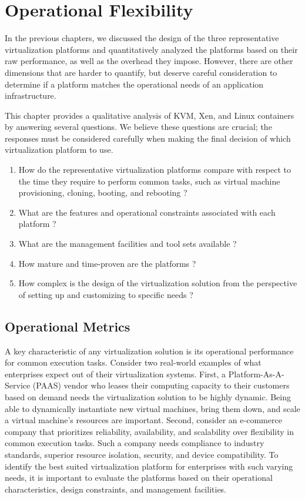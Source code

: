 \chapter{Operational Flexibility}

In the previous chapters, we discussed the design of the three representative virtualization platforms and quantitatively analyzed the platforms based on their raw performance, as well as the overhead they impose. However, there are other dimensions that are harder to quantify, but deserve careful consideration to determine if a platform matches the operational needs of an application infrastructure. %

This chapter provides a qualitative analysis of KVM, Xen, and Linux containers by answering several questions. We believe these questions are crucial; the responses must be considered carefully when making the final decision of which virtualization platform to use.

\begin{enumerate}
\item How do the representative virtualization platforms compare with respect to the time they require to perform common tasks, such as virtual machine provisioning, cloning, booting, and rebooting ?
\item What are the features and operational constraints associated with each platform ?
\item What are the management facilities and tool sets available ?
\item How mature and time-proven are the platforms ?
\item How complex is the design of the virtualization solution from the perspective of setting up and customizing to specific needs ?
\end{enumerate}


\section{Operational Metrics}

A key characteristic of any virtualization solution is its operational performance for common execution tasks. Consider two real-world examples of what enterprises expect out of their virtualization systems. First, a Platform-As-A-Service (PAAS) vendor who leases their computing capacity to their customers based on demand needs the virtualization solution to be highly dynamic. Being able to dynamically instantiate new virtual machines, bring them down, and scale a virtual machine's resources are important. Second, consider an e-commerce company that prioritizes reliability, availability, and scalability over flexibility in common execution tasks. Such a company needs compliance to industry standards, superior resource isolation, security, and device compatibility. To identify the best suited virtualization platform for enterprises with such varying needs, it is important to evaluate the platforms based on their operational characteristics, design constraints, and management facilities.


